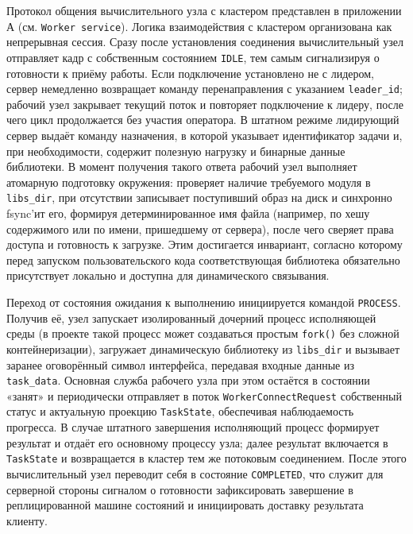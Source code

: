 Протокол общения вычислительного узла с кластером представлен в приложении А
(см. \texttt{Worker service}). Логика взаимодействия с кластером организована
как непрерывная сессия. Сразу после установления соединения вычислительный узел
отправляет кадр с собственным состоянием \texttt{IDLE}, тем самым сигнализируя
о готовности к приёму работы. Если подключение установлено не с лидером, сервер
немедленно возвращает команду перенаправления с указанием \texttt{leader\_id};
рабочий узел закрывает текущий поток и повторяет подключение к лидеру, после
чего цикл продолжается без участия оператора. В штатном режиме лидирующий
сервер выдаёт команду назначения, в которой указывает идентификатор задачи и,
при необходимости, содержит полезную нагрузку и бинарные данные библиотеки. В
момент получения такого ответа рабочий узел выполняет атомарную подготовку
окружения: проверяет наличие требуемого модуля в \texttt{libs\_dir}, при
отсутствии записывает поступивший образ на диск и синхронно fsync’ит его,
формируя детерминированное имя файла (например, по хешу содержимого или по
имени, пришедшему от сервера), после чего сверяет права доступа и готовность к
загрузке. Этим достигается инвариант, согласно которому перед запуском
пользовательского кода соответствующая библиотека обязательно присутствует
локально и доступна для динамического связывания.

Переход от состояния ожидания к выполнению инициируется командой
\texttt{PROCESS}. Получив её, узел запускает изолированный дочерний процесс
исполняющей среды (в проекте такой процесс может создаваться простым
\texttt{fork()} без сложной контейнеризации), загружает динамическую библиотеку
из \texttt{libs\_dir} и вызывает заранее оговорённый символ интерфейса,
передавая входные данные из \texttt{task\_data}. Основная служба рабочего узла при
этом остаётся в состоянии «занят» и периодически отправляет в поток
\texttt{WorkerConnectRequest} собственный статус и актуальную проекцию
\texttt{TaskState}, обеспечивая наблюдаемость прогресса. В случае штатного
завершения исполняющий процесс формирует результат и отдаёт его основному
процессу узла; далее результат включается в \texttt{TaskState} и возвращается в
кластер тем же потоковым соединением. После этого вычислительный узел переводит
себя в состояние \texttt{COMPLETED}, что служит для серверной стороны сигналом
о готовности зафиксировать завершение в реплицированной машине состояний и
инициировать доставку результата клиенту.

